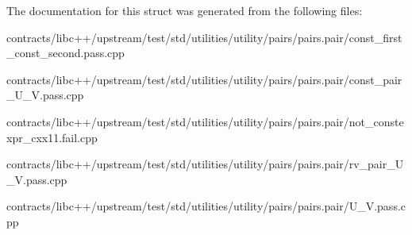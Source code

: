 The documentation for this struct was generated from the following files\+:\begin{DoxyCompactItemize}
\item 
contracts/libc++/upstream/test/std/utilities/utility/pairs/pairs.\+pair/const\+\_\+first\+\_\+const\+\_\+second.\+pass.\+cpp\item 
contracts/libc++/upstream/test/std/utilities/utility/pairs/pairs.\+pair/const\+\_\+pair\+\_\+\+U\+\_\+\+V.\+pass.\+cpp\item 
contracts/libc++/upstream/test/std/utilities/utility/pairs/pairs.\+pair/not\+\_\+constexpr\+\_\+cxx11.\+fail.\+cpp\item 
contracts/libc++/upstream/test/std/utilities/utility/pairs/pairs.\+pair/rv\+\_\+pair\+\_\+\+U\+\_\+\+V.\+pass.\+cpp\item 
contracts/libc++/upstream/test/std/utilities/utility/pairs/pairs.\+pair/U\+\_\+\+V.\+pass.\+cpp\end{DoxyCompactItemize}
